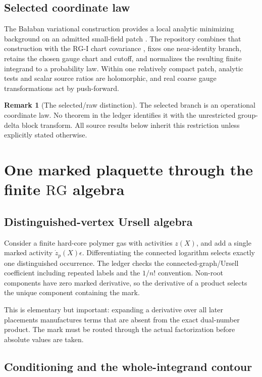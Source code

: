 \documentclass[11pt]{article}
\theoremstyle{definition}
\newtheorem{remark}[theorem]{Remark}
\newcommand{\RG}{\mathrm{RG}}
\begin{document}
\subsection{Selected coordinate law}

The Ba{\l}aban variational construction provides a local analytic
minimizing background on an admitted small-field patch
\cite{balaban1985variational}.  The repository combines that construction
with the \(\RG\)-I chart covariance
\cite{balaban1987rgi,balaban1985variational}, fixes one near-identity
branch, retains the chosen gauge chart and cutoff, and normalizes the
resulting finite integrand to a probability law.  Within one relatively
compact patch, analytic tests and scalar source ratios are holomorphic, and
real coarse gauge transformations act by push-forward.

\begin{remark}[The selected/raw distinction]
The selected branch is an operational coordinate law.  No theorem in the
ledger identifies it with the unrestricted group-delta block transform.
All source results below inherit this restriction unless explicitly stated
otherwise.
\end{remark}

\section{One marked plaquette through the finite \(\RG\) algebra}

\subsection{Distinguished-vertex Ursell algebra}

Consider a finite hard-core polymer gas with activities \(z(X)\), and add a
single marked activity \(\dot z_p(X)\epsilon\).  Differentiating the
connected logarithm selects exactly one distinguished occurrence.  The
ledger checks the connected-graph/Ursell coefficient including repeated
labels and the \(1/n!\) convention.  Non-root components have zero marked
derivative, so the derivative of a product selects the unique component
containing the mark.

This is elementary but important: expanding a derivative over all later
placements manufactures terms that are absent from the exact dual-number
product.  The mark must be routed through the actual factorization before
absolute values are taken.

\subsection{Conditioning and the whole-integrand contour}
\end{document}
